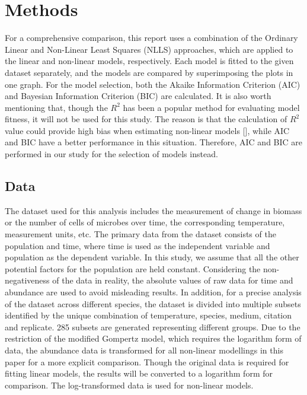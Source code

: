 \documentclass[11pt, oneside]{article}
\begin{document}
	\pagebreak

	\section{Methods}


	For a comprehensive comparison, this report uses a combination of the Ordinary Linear and Non-Linear Least Squares (NLLS) approaches, which are applied to the linear and non-linear models, respectively. Each model is fitted to the given dataset separately, and the models are compared by superimposing the plots in one graph. For the model selection, both the Akaike Information Criterion (AIC) and Bayesian Information Criterion (BIC) are calculated. It is also worth mentioning that, though the \(R^2\) has been a popular method for evaluating model fitness, it will not be used for this study. The reason is that the calculation of \(R^2\) value could provide high bias when estimating non-linear models [\cite{spiess2010evaluation}], while AIC and BIC have a better performance in this situation. Therefore, AIC and BIC are performed in our study for the selection of models instead.

 		\subsection{Data}
 
		The dataset used for this analysis includes the measurement of change in biomass or the number of cells of microbes over time, the corresponding temperature, measurement units, etc. The primary data from the dataset consists of the population and time, where time is used as the independent variable and population as the dependent variable. In this study, we assume that all the other potential factors for the population are held constant. Considering the non-negativeness of the data in reality, the absolute values of raw data for time and abundance are used to avoid misleading results. In addition, for a precise analysis of the dataset across different species, the dataset is divided into multiple subsets identified by the unique combination of temperature, species, medium, citation and replicate. 285 subsets are generated representing different groups. Due to the restriction of the modified Gompertz model, which requires the logarithm form of data, the abundance data is transformed for all non-linear modellings in this paper for a more explicit comparison. Though the original data is required for fitting linear models, the results will be converted to a logarithm form for comparison. The log-transformed data is used for non-linear models.
\end{document}
